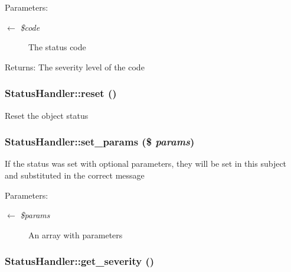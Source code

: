 \begin{Desc}
\item[Parameters:]
\begin{description}
\item[\mbox{$\leftarrow$} {\em \$code}]The status code \end{description}
\end{Desc}
\begin{Desc}
\item[Returns:]The severity level of the code \end{Desc}
\hypertarget{classStatusHandler_8b0a327d3272ae49032a596518d47164}{
\subsubsection{\setlength{\rightskip}{0pt plus 5cm}StatusHandler::reset ()}}
\label{classStatusHandler_8b0a327d3272ae49032a596518d47164}


Reset the object status \hypertarget{classStatusHandler_c35544d3ad8a435f69db0965ed674428}{
\subsubsection{\setlength{\rightskip}{0pt plus 5cm}StatusHandler::set\_\-params (\$ {\em params})}}
\label{classStatusHandler_c35544d3ad8a435f69db0965ed674428}


If the status was set with optional parameters, they will be set in this subject and substituted in the correct message

\begin{Desc}
\item[Parameters:]
\begin{description}
\item[\mbox{$\leftarrow$} {\em \$params}]An array with parameters \end{description}
\end{Desc}
\hypertarget{classStatusHandler_32c76648dd45915d1be9b78bebc410b1}{
\subsubsection{\setlength{\rightskip}{0pt plus 5cm}StatusHandler::get\_\-severity ()}}
\label{classStatusHandler_32c76648dd45915d1be9b78bebc410b1}


